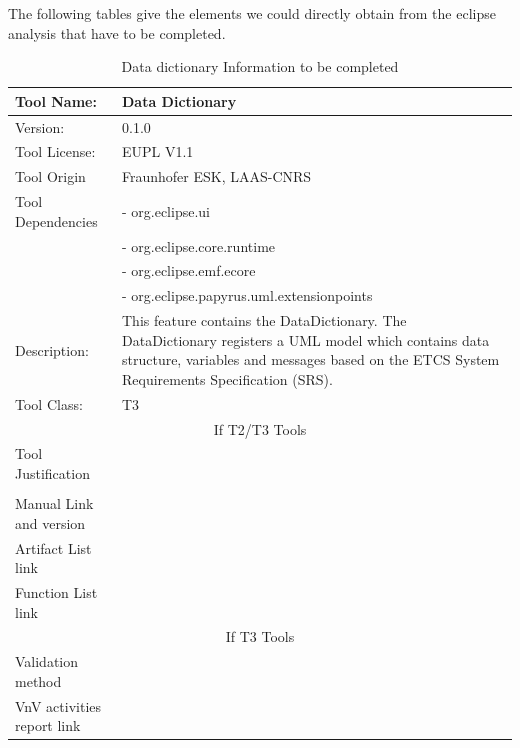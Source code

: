 The following tables give the elements we could directly obtain from the
eclipse analysis that have to  be completed.

\begin{table}[htbp]
\centering
\caption{\label{tbl:datadict}Data dictionary  Information to be completed}
\begin{tabular}{|l|p{7cm}|}\hline
Tool Name: &Data Dictionary\\\hline
Version: &0.1.0 \\\hline
Tool License:& EUPL V1.1\\\hline
Tool Origin & Fraunhofer ESK, LAAS-CNRS \\
Tool Dependencies & - org.eclipse.ui \\
&-  org.eclipse.core.runtime\\
& - org.eclipse.emf.ecore\\
& - org.eclipse.papyrus.uml.extensionpoints \\ \hline
Description: & This feature contains the DataDictionary. The DataDictionary registers a UML model which contains data structure, variables and messages based on the ETCS System Requirements Specification (SRS). \\ \hline
Tool Class: & T3 \\\hline
\multicolumn{2}{|c|}{If T2/T3 Tools}\\\hline
Tool Justification & \\
 & \\ \hline
Manual Link and version & \\\hline
Artifact List link & \\\hline
Function List link& \\\hline
\multicolumn{2}{|c|}{If T3 Tools}\\\hline
Validation method& \\\hline
VnV activities report link&\\\hline
\end{tabular}
\end{table}

